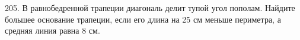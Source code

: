 205. В равнобедренной трапеции диагональ делит тупой угол пополам. Найдите большее основание трапеции, если его длина на 25 см меньше периметра, а средняя линия равна 8 см.\\
